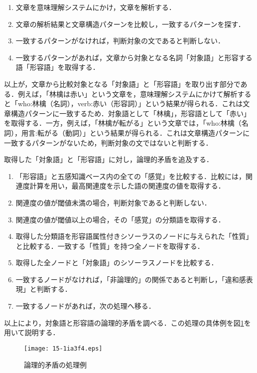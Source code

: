 \documentclass[japanese]{jnlp_1.4}
\begin{document}
\begin{enumerate}
	\item 文章を意味理解システムにかけ，文章を解析する．
	\item 文章の解析結果と文章構造パターンを比較し，一致するパターンを探す．
	\item 一致するパターンがなければ，判断対象の文であると判断しない．
	\item 一致するパターンがあれば，文章から対象となる名詞「対象語」と形容する語「形容語」を取得する．
\end{enumerate}
以上が，文章から比較対象となる「対象語」と「形容語」を取り出す部分である．例えば，「林檎は赤い」という文章を，意味理解システムにかけて解析すると「who:林檎（名詞），verb:赤い（形容詞）」という結果が得られる．これは文章構造パターンに一致するため．対象語として「林檎」，形容語として「赤い」を取得する．一方，例えば，「林檎が転がる」という文章では，「who:林檎（名詞），用言:転がる（動詞）」という結果が得られる．これは文章構造パターンに一致するパターンがないため，判断対象の文ではないと判断する．

取得した「対象語」と「形容語」に対し，論理的矛盾を追及する．
\begin{enumerate}
	\item 「形容語」と五感知識ベース内の全ての「感覚」を比較する．比較には，関連度計算を用い，最高関連度を示した語の関連度の値を取得する．
	\item 関連度の値が閾値未満の場合，判断対象であると判断しない．
	\item 関連度の値が閾値以上の場合，その「感覚」の分類語を取得する．
	\item 取得した分類語を形容語属性付きシソーラスのノードに与えられた「性質」と比較する．一致する「性質」を持つ全ノードを取得する．
	\item 取得した全ノードと「対象語」のシソーラスノードを比較する．
	\item 一致するノードがなければ，「非論理的」の関係であると判断し，「違和感表現」と判断する．
	\item 一致するノードがあれば，次の処理へ移る．
\end{enumerate}
以上により，対象語と形容語の論理的矛盾を調べる．この処理の具体例を図\ref{fig:RonritekiMujun}を用いて説明する．

\begin{figure}[b]
	\begin{center}
    \texttt{[image: 15-1ia3f4.eps]}
	\caption{論理的矛盾の処理例}
	\label{fig:RonritekiMujun}
	\end{center}
\end{figure}
\end{document}
